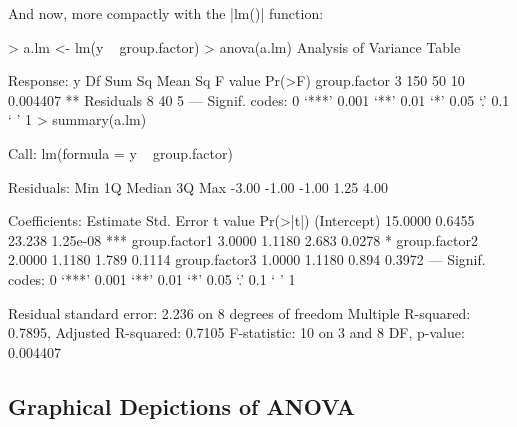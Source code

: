 And now, more compactly with the |lm()| function:
\begin{R}
> a.lm <- lm(y ~ group.factor)
> anova(a.lm)
Analysis of Variance Table

Response: y
             Df Sum Sq Mean Sq F value   Pr(>F)   
group.factor  3    150      50      10 0.004407 **
Residuals     8     40       5                    
---
Signif. codes:  0 ‘***’ 0.001 ‘**’ 0.01 ‘*’ 0.05 ‘.’ 0.1 ‘ ’ 1 
> summary(a.lm)

Call:
lm(formula = y ~ group.factor)

Residuals:
   Min     1Q Median     3Q    Max 
 -3.00  -1.00  -1.00   1.25   4.00 

Coefficients:
              Estimate Std. Error t value Pr(>|t|)    
(Intercept)    15.0000     0.6455  23.238 1.25e-08 ***
group.factor1   3.0000     1.1180   2.683   0.0278 *  
group.factor2   2.0000     1.1180   1.789   0.1114    
group.factor3   1.0000     1.1180   0.894   0.3972    
---
Signif. codes:  0 ‘***’ 0.001 ‘**’ 0.01 ‘*’ 0.05 ‘.’ 0.1 ‘ ’ 1 

Residual standard error: 2.236 on 8 degrees of freedom
Multiple R-squared: 0.7895, Adjusted R-squared: 0.7105 
F-statistic:    10 on 3 and 8 DF,  p-value: 0.004407 
\end{R}

\subsection{Graphical Depictions of ANOVA}

